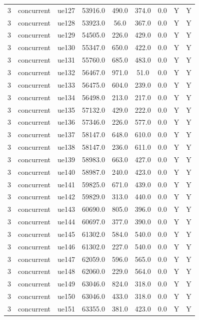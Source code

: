 \begin{table}[ht]
\begin{tabular}{|c|c|c|c|c|c|c|c|c|}
3 & concurrent & ue127 & 53916.0 & 490.0 & 374.0 & 0.0 & Y & Y \\
3 & concurrent & ue128 & 53923.0 & 56.0 & 367.0 & 0.0 & Y & Y \\
3 & concurrent & ue129 & 54505.0 & 226.0 & 429.0 & 0.0 & Y & Y \\
3 & concurrent & ue130 & 55347.0 & 650.0 & 422.0 & 0.0 & Y & Y \\
3 & concurrent & ue131 & 55760.0 & 685.0 & 483.0 & 0.0 & Y & Y \\
3 & concurrent & ue132 & 56467.0 & 971.0 & 51.0 & 0.0 & Y & Y \\
3 & concurrent & ue133 & 56475.0 & 604.0 & 239.0 & 0.0 & Y & Y \\
3 & concurrent & ue134 & 56498.0 & 213.0 & 217.0 & 0.0 & Y & Y \\
3 & concurrent & ue135 & 57132.0 & 429.0 & 222.0 & 0.0 & Y & Y \\
3 & concurrent & ue136 & 57346.0 & 226.0 & 577.0 & 0.0 & Y & Y \\
3 & concurrent & ue137 & 58147.0 & 648.0 & 610.0 & 0.0 & Y & Y \\
3 & concurrent & ue138 & 58147.0 & 236.0 & 611.0 & 0.0 & Y & Y \\
3 & concurrent & ue139 & 58983.0 & 663.0 & 427.0 & 0.0 & Y & Y \\
3 & concurrent & ue140 & 58987.0 & 240.0 & 423.0 & 0.0 & Y & Y \\
3 & concurrent & ue141 & 59825.0 & 671.0 & 439.0 & 0.0 & Y & Y \\
3 & concurrent & ue142 & 59829.0 & 313.0 & 440.0 & 0.0 & Y & Y \\
3 & concurrent & ue143 & 60690.0 & 805.0 & 396.0 & 0.0 & Y & Y \\
3 & concurrent & ue144 & 60697.0 & 377.0 & 390.0 & 0.0 & Y & Y \\
3 & concurrent & ue145 & 61302.0 & 584.0 & 540.0 & 0.0 & Y & Y \\
3 & concurrent & ue146 & 61302.0 & 227.0 & 540.0 & 0.0 & Y & Y \\
3 & concurrent & ue147 & 62059.0 & 596.0 & 565.0 & 0.0 & Y & Y \\
3 & concurrent & ue148 & 62060.0 & 229.0 & 564.0 & 0.0 & Y & Y \\
3 & concurrent & ue149 & 63046.0 & 824.0 & 318.0 & 0.0 & Y & Y \\
3 & concurrent & ue150 & 63046.0 & 433.0 & 318.0 & 0.0 & Y & Y \\
3 & concurrent & ue151 & 63355.0 & 381.0 & 423.0 & 0.0 & Y & Y \\

\end{tabular}
\end{table}
